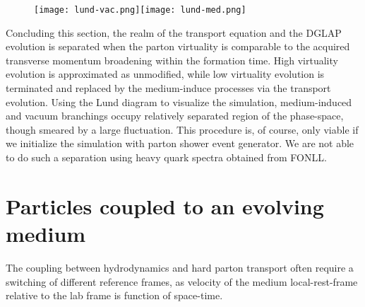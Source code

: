 \begin{figure}
\texttt{[image: lund-vac.png]}\texttt{[image: lund-med.png]}
\caption{}
\label{fig:lund}
\end{figure}

Concluding this section, the realm of the transport equation and the DGLAP evolution is separated when the parton virtuality is comparable to the acquired transverse momentum broadening within the formation time.
High virtuality evolution is approximated as unmodified, while low virtuality evolution is terminated and replaced by the medium-induce processes via the transport evolution. 
Using the Lund diagram to visualize the simulation, medium-induced and vacuum branchings occupy relatively separated region of the phase-space, though smeared by a large fluctuation.
This procedure is, of course, only viable if we initialize the simulation with parton shower event generator.
We are not able to do such a separation using heavy quark spectra obtained from FONLL.

\section{Particles coupled to an evolving medium}
The coupling between hydrodynamics and hard parton transport often require a switching of different reference frames, as velocity of the medium local-rest-frame relative to the lab frame is function of space-time.


